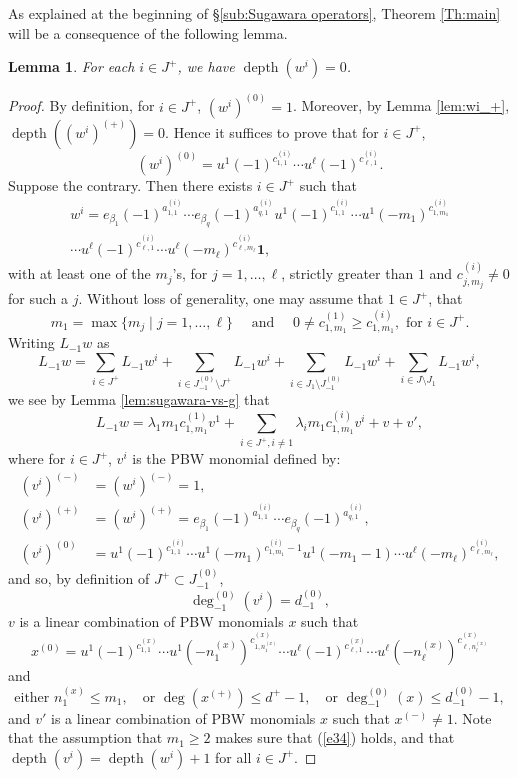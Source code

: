 \documentclass[JEP,XML,SOM,Unicode]{cedram}
\let\be\beta
\DeclareMathOperator{\dep}{depth}
\newtheorem{lem}[theorem]{Lemma}
\theoremstyle{definition}
\begin{document}
As explained at the beginning of \S\ref{sub:Sugawara operators}, Theorem
\ref{Th:main} will be a consequence of the following lemma.

\begin{lem}
\label{lem:w_0}
For each $i\in J^+$, we have $\dep(w^{i})=0$.
\end{lem}
\begin{proof}
By definition, for $i\in J^+$, $(w^i)^{(0)}=1$. Moreover, by Lemma \ref{lem:wi_+},
$\dep((w^i)^{(+)})=0$. Hence it suffices to prove that for $i\in J^+$,
\[
(w^{i})^{(0)}=u^{1}(-1)^{c^{(i)}_{1,1}}\cdots u^\ell (-1)^{c^{(i)}_{\ell,1}}.
\]
Suppose the contrary. Then
there exists $i \in J^+$ such that
\begin{multline*}
w^i = e_{\be_1}(-1)^{a^{(i)}_{1,1}}\cdots e_{\be_{q}}(-1)^{a^{(i)}_{q,1}} u^{1}(-1)^{c^{(i)}_{1,1}}
\cdots u^{1}(-m_{1})^{c^{(i)}_{1,m_1}} \\[-5pt]
\cdots u^\ell (-1)^{c^{(i)}_{\ell,1}} \cdots u^\ell(-m_{\ell})^{c^{(i)}_{\ell,m_\ell}} \mathbf{1},
\end{multline*}
with at least one of the $m_j$'s, for $j=1,\dots,\ell$, strictly greater than $1$
and $c^{(i)}_{j,m_j} \not=0$ for such a $j$.
Without loss of generality,
one may assume that $1 \in J^+$, that
\[
m_1=\max\{ m_j\mid j=1,\dots,\ell\} \quad \text{ and }
\quad 0\neq c^{(1)}_{1,m_1} \geq c^{(i)}_{1,m_1}, \text{ for } i\in J^+.
\]
Writing $L_{-1}w$ as
\[
L_{-1}w=\sum_{i \in J^+ }L_{-1}w^i
+\sum_{i\in J_{-1}^{(0)}\setminus J^+}L_{-1}w^i
+\sum_{i\in J_1\setminus J_{-1}^{(0)}}L_{-1}w^i
+\sum_{i \in J \setminus J_1}L_{-1}w^i,
\]
we see by Lemma \ref{lem:sugawara-vs-g} that
\begin{equation}\label{e17}
L_{-1}w=\lambda_1 m_1c^{(1)}_{1,m_1} v^1+\sum_{i\in J^+,i\neq 1}\lambda_im_1c^{(i)}_{1,m_1}v^i+v
+v',
\end{equation}
where for $i\in J^+$, $v^{i}$ is the PBW monomial defined by:
\begin{align}\label{e14}
(v^i)^{(-)}&=(w^i)^{(-)}=1,
\\
\label{e13}
(v^i)^{(+)}&=(w^i)^{(+)}=e_{\be_1}(-1)^{a^{(i)}_{1,1}}\cdots e_{\be_{q}}(-1)^{a^{(i)}_{q,1}},
\\
\label{e33}
(v^i)^{(0)} & = u^{1}(-1)^{c^{(i)}_{1,1}}\cdots
u^{1}(-m_{1})^{c^{(i)}_{1,m_1}-1}u^{1}(-m_{1}-1)\cdots u^\ell (-m_{\ell})^{c^{(i)}_{\ell,m_\ell}},
\end{align}
and so, by definition of $J^+ \subset J_{-1}^{(0)}$,
\begin{equation}\label{e34}
\deg_{-1}^{(0)}(v^i)=d_{-1}^{(0)},
\end{equation}
$v$ is a linear combination of PBW monomials $x$ such that
\[
x^{(0)}=u^{1}(-1)^{c^{(x)}_{1,1}}\cdots u^{1}(- n_{1}^{(x)})^{c^{(x)}_{1,n_{1}^{(x)}}}
\cdots u^\ell (-1)^{c^{(x)}_{\ell,1}}\cdots u^\ell(-n_{\ell}^{(x)})^{c^{(x)}_{\ell,n_{\ell}^{(x)}}}
\]
and
\[
\text{either } n_{1}^{(x)}\leq m_1,\quad
\text{or }
\deg(x^{(+)})\leq d^+ -1,\quad
\text{or }
\deg_{-1}^{(0)}(x)\leq d_{-1}^{(0)}-1,
\]
and $v'$ is a linear combination of PBW monomials $x$ such that $x^{(-)}\neq 1$.
Note that the assumption that $m_1\geq 2$ makes sure that (\ref{e34}) holds,
and that $\dep(v^{i}) =\dep(w^i)+1$ for all $i \in J^+$.


\end{proof}
\end{document}
